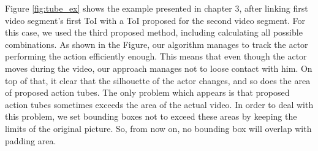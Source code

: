 Figure \ref{fig:tube_ex} shows the example presented in chapter 3, after linking first video segment's first ToI with a ToI proposed for the second video segment. For this case, we used the third proposed method, including calculating all possible combinations. As shown in the Figure,
our algorithm manages to track the actor performing the action efficiently enough. This means that even though the actor moves during the
video, our approach manages not to loose contact with him. On top of that, it clear that the silhouette of the actor changes, and so does the area of proposed action tubes. The only problem which appears is that proposed action tubes sometimes exceeds the area of the actual video.
In order to deal with this problem, we set bounding boxes not to exceed these areas by keeping the limits of the original picture. So,
from now on, no bounding box will overlap with padding area.

% 
